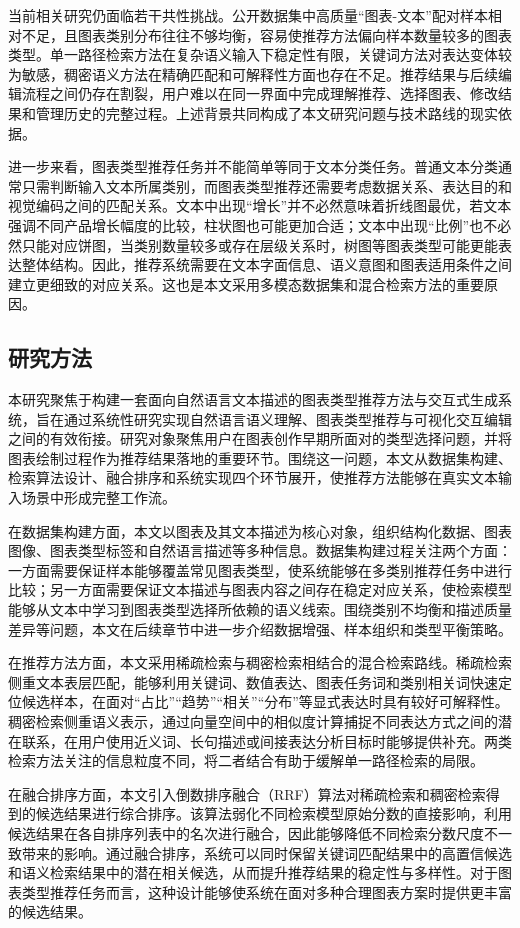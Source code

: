 当前相关研究仍面临若干共性挑战。公开数据集中高质量“图表-文本”配对样本相对不足，且图表类别分布往往不够均衡，容易使推荐方法偏向样本数量较多的图表类型。单一路径检索方法在复杂语义输入下稳定性有限，关键词方法对表达变体较为敏感，稠密语义方法在精确匹配和可解释性方面也存在不足。推荐结果与后续编辑流程之间仍存在割裂，用户难以在同一界面中完成理解推荐、选择图表、修改结果和管理历史的完整过程。上述背景共同构成了本文研究问题与技术路线的现实依据。

进一步来看，图表类型推荐任务并不能简单等同于文本分类任务。普通文本分类通常只需判断输入文本所属类别，而图表类型推荐还需要考虑数据关系、表达目的和视觉编码之间的匹配关系。文本中出现“增长”并不必然意味着折线图最优，若文本强调不同产品增长幅度的比较，柱状图也可能更加合适；文本中出现“比例”也不必然只能对应饼图，当类别数量较多或存在层级关系时，树图等图表类型可能更能表达整体结构。因此，推荐系统需要在文本字面信息、语义意图和图表适用条件之间建立更细致的对应关系。这也是本文采用多模态数据集和混合检索方法的重要原因。


\subsection{研究方法}
本研究聚焦于构建一套面向自然语言文本描述的图表类型推荐方法与交互式生成系统，旨在通过系统性研究实现自然语言语义理解、图表类型推荐与可视化交互编辑之间的有效衔接。研究对象聚焦用户在图表创作早期所面对的类型选择问题，并将图表绘制过程作为推荐结果落地的重要环节。围绕这一问题，本文从数据集构建、检索算法设计、融合排序和系统实现四个环节展开，使推荐方法能够在真实文本输入场景中形成完整工作流。

在数据集构建方面，本文以图表及其文本描述为核心对象，组织结构化数据、图表图像、图表类型标签和自然语言描述等多种信息。数据集构建过程关注两个方面：一方面需要保证样本能够覆盖常见图表类型，使系统能够在多类别推荐任务中进行比较；另一方面需要保证文本描述与图表内容之间存在稳定对应关系，使检索模型能够从文本中学习到图表类型选择所依赖的语义线索。围绕类别不均衡和描述质量差异等问题，本文在后续章节中进一步介绍数据增强、样本组织和类型平衡策略。

在推荐方法方面，本文采用稀疏检索与稠密检索相结合的混合检索路线。稀疏检索侧重文本表层匹配，能够利用关键词、数值表达、图表任务词和类别相关词快速定位候选样本，在面对“占比”“趋势”“相关”“分布”等显式表达时具有较好可解释性。稠密检索侧重语义表示，通过向量空间中的相似度计算捕捉不同表达方式之间的潜在联系，在用户使用近义词、长句描述或间接表达分析目标时能够提供补充。两类检索方法关注的信息粒度不同，将二者结合有助于缓解单一路径检索的局限。

在融合排序方面，本文引入倒数排序融合（RRF）算法对稀疏检索和稠密检索得到的候选结果进行综合排序。该算法弱化不同检索模型原始分数的直接影响，利用候选结果在各自排序列表中的名次进行融合，因此能够降低不同检索分数尺度不一致带来的影响。通过融合排序，系统可以同时保留关键词匹配结果中的高置信候选和语义检索结果中的潜在相关候选，从而提升推荐结果的稳定性与多样性。对于图表类型推荐任务而言，这种设计能够使系统在面对多种合理图表方案时提供更丰富的候选结果。

